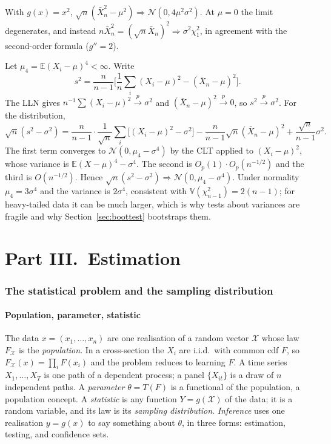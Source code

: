 \documentclass[11pt,a4paper]{article}
\newcommand{\E}{\mathbb{E}}
\newcommand{\V}{\mathbb{V}}
\newcommand{\N}{\mathcal{N}}
\newcommand{\cp}{\xrightarrow{\;p\;}}
\newcommand{\cd}{\Rightarrow}
\newcommand{\Op}{O_p}
\newcommand{\iid}{i.i.d.}
\newcommand{\Xbar}{\bar X_n}
\begin{document}
\begin{example}\label{ex:xbarsq}
With $g(x)=x^2$, $\sqrt n(\Xbar^2-\mu^2)\cd\N(0,4\mu^2\sigma^2)$. At $\mu=0$ the limit degenerates, and instead $n\Xbar^2=(\sqrt n\Xbar)^2\cd\sigma^2\chi^2_1$, in agreement with the second-order formula ($g''=2$).
\end{example}

\begin{example}\label{ex:s2}
Let $\mu_4=\E(X_i-\mu)^4<\infty$. Write
\[
s^2=\frac{n}{n-1}\Big[\frac1n\sum_i(X_i-\mu)^2-(\Xbar-\mu)^2\Big].
\]
The LLN gives $n^{-1}\sum(X_i-\mu)^2\cp\sigma^2$ and $(\Xbar-\mu)^2\cp0$, so $s^2\cp\sigma^2$. For the distribution,
\[
\sqrt n(s^2-\sigma^2)=\frac{n}{n-1}\cdot\frac{1}{\sqrt n}\sum_i\big[(X_i-\mu)^2-\sigma^2\big]-\frac{n}{n-1}\sqrt n(\Xbar-\mu)^2+\frac{\sqrt n}{n-1}\sigma^2 .
\]
The first term converges to $\N(0,\mu_4-\sigma^4)$ by the CLT applied to $(X_i-\mu)^2$, whose variance is $\E(X-\mu)^4-\sigma^4$. The second is $\Op(1)\cdot\Op(n^{-1/2})$ and the third is $O(n^{-1/2})$. Hence $\sqrt n(s^2-\sigma^2)\cd\N(0,\mu_4-\sigma^4)$. Under normality $\mu_4=3\sigma^4$ and the variance is $2\sigma^4$, consistent with $\V(\chi^2_{n-1})=2(n-1)$; for heavy-tailed data it can be much larger, which is why tests about variances are fragile and why Section~\ref{sec:boottest} bootstraps them.
\end{example}

\clearpage
\part*{Part III.\ Estimation}

\section{The statistical problem and the sampling distribution}\label{sec:stat}

\subsection{Population, parameter, statistic}

The data $x=(x_1,\ldots,x_n)$ are one realisation of a random vector $\mathcal X$ whose law $F_{\mathcal X}$ is the \emph{population}. In a cross-section the $X_i$ are \iid\ with common cdf $F$, so $F_{\mathcal X}(x)=\prod_iF(x_i)$ and the problem reduces to learning $F$. A time series $X_1,\ldots,X_T$ is one path of a dependent process; a panel $\{X_{it}\}$ is a draw of $n$ independent paths. A \emph{parameter} $\theta=T(F)$ is a functional of the population, a population concept. A \emph{statistic} is any function $Y=g(\mathcal X)$ of the data; it is a random variable, and its law is its \emph{sampling distribution}. \emph{Inference} uses one realisation $y=g(x)$ to say something about $\theta$, in three forms: estimation, testing, and confidence sets.
\end{document}
